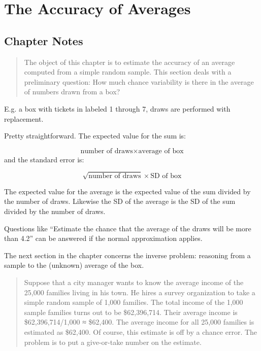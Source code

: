 \documentclass[
]{book}
\begin{document}
\hypertarget{accuracy_averages}{%
\chapter{The Accuracy of Averages}\label{accuracy_averages}}

\hypertarget{chapter-notes-22}{%
\section{Chapter Notes}\label{chapter-notes-22}}

\begin{quote}
The object of this chapter is to estimate the accuracy of an average computed from a simple random sample. This section deals with a preliminary question: How much chance variability is there in the average of numbers drawn from a box?
\end{quote}

E.g. a box with tickets in labeled 1 through 7, draws are performed with replacement.

Pretty straightforward. The expected value for the sum is:

\[
\text{number of draws} \times \text{average of box}
\]
and the standard error is:

\[
\sqrt{\text{number of draws}} \times \text{SD of box}
\]

The expected value for the average is the expected value of the sum divided by the number of draws. Likewise the SD of the average is the SD of the sum divided by the number of draws.

Questions like ``Estimate the chance that the average of the draws will be more than 4.2'' can be answered if the normal approximation applies.

The next section in the chapter concerns the inverse problem: reasoning from a sample to the (unknown) average of the box.

\begin{quote}
Suppose that a city manager wants to know the average income of the 25,000 families living in his town. He hires a survey organization to take a simple random sample of 1,000 families. The total income of the 1,000 sample families turns out to be \$62,396,714. Their average income is \$62,396,714/1,000 ≈ \$62,400. The average income for all 25,000 families is estimated as \$62,400. Of course, this estimate is off by a chance error. The problem is to put a give-or-take number on the estimate.
\end{quote}
\end{document}
